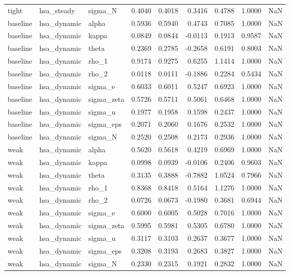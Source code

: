 \begin{tabular}{lllrrrrrl}
tight & hsa\_steady & sigma\_N & 0.4040 & 0.4018 & 0.3416 & 0.4788 & 1.0000 & NaN \\
baseline & hsa\_dynamic & alpha & 0.5936 & 0.5940 & 0.4743 & 0.7085 & 1.0000 & NaN \\
baseline & hsa\_dynamic & kappa & 0.0849 & 0.0844 & -0.0113 & 0.1913 & 0.9587 & NaN \\
baseline & hsa\_dynamic & theta & 0.2369 & 0.2785 & -0.2658 & 0.6191 & 0.8003 & NaN \\
baseline & hsa\_dynamic & rho\_1 & 0.9174 & 0.9275 & 0.6255 & 1.1414 & 1.0000 & NaN \\
baseline & hsa\_dynamic & rho\_2 & 0.0118 & 0.0111 & -0.1886 & 0.2284 & 0.5434 & NaN \\
baseline & hsa\_dynamic & sigma\_e & 0.6033 & 0.6011 & 0.5247 & 0.6923 & 1.0000 & NaN \\
baseline & hsa\_dynamic & sigma\_zeta & 0.5726 & 0.5711 & 0.5061 & 0.6468 & 1.0000 & NaN \\
baseline & hsa\_dynamic & sigma\_u & 0.1977 & 0.1958 & 0.1598 & 0.2437 & 1.0000 & NaN \\
baseline & hsa\_dynamic & sigma\_eps & 0.2071 & 0.2060 & 0.1676 & 0.2532 & 1.0000 & NaN \\
baseline & hsa\_dynamic & sigma\_N & 0.2520 & 0.2508 & 0.2173 & 0.2936 & 1.0000 & NaN \\
weak & hsa\_dynamic & alpha & 0.5620 & 0.5618 & 0.4219 & 0.6969 & 1.0000 & NaN \\
weak & hsa\_dynamic & kappa & 0.0998 & 0.0939 & -0.0106 & 0.2406 & 0.9603 & NaN \\
weak & hsa\_dynamic & theta & 0.3135 & 0.3888 & -0.7882 & 1.0524 & 0.7966 & NaN \\
weak & hsa\_dynamic & rho\_1 & 0.8368 & 0.8418 & 0.5164 & 1.1276 & 1.0000 & NaN \\
weak & hsa\_dynamic & rho\_2 & 0.0726 & 0.0673 & -0.1980 & 0.3681 & 0.6944 & NaN \\
weak & hsa\_dynamic & sigma\_e & 0.6000 & 0.6005 & 0.5028 & 0.7016 & 1.0000 & NaN \\
weak & hsa\_dynamic & sigma\_zeta & 0.5995 & 0.5981 & 0.5305 & 0.6780 & 1.0000 & NaN \\
weak & hsa\_dynamic & sigma\_u & 0.3117 & 0.3103 & 0.2637 & 0.3677 & 1.0000 & NaN \\
weak & hsa\_dynamic & sigma\_eps & 0.3208 & 0.3193 & 0.2683 & 0.3827 & 1.0000 & NaN \\
weak & hsa\_dynamic & sigma\_N & 0.2330 & 0.2315 & 0.1921 & 0.2832 & 1.0000 & NaN \\

\end{tabular}
